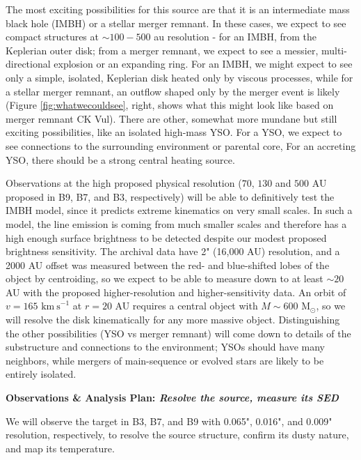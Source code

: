\documentclass[12pt,a4paper]{article}  %
\newcommand{\msun}{\ensuremath{\mathrm{M}_\odot}\xspace}
\newcommand{\kms}{\ensuremath{\mathrm{km~s}^{-1}}\xspace}
\begin{document}


The most exciting possibilities for this source are that it is an intermediate mass black hole (IMBH) or  a stellar merger remnant.
In these cases, we expect to see compact structures at $\sim100-500$ au resolution - for an IMBH, from the Keplerian outer disk; from a merger remnant, we expect to see a messier, multi-directional explosion or an expanding ring.
For an IMBH, we might expect to see only a simple, isolated, Keplerian disk heated only by viscous processes,
while for a stellar merger remnant, an outflow shaped only by the merger event is likely (Figure \ref{fig:whatwecouldsee}, right, shows what this might look like based on merger remnant CK Vul).
There are other, somewhat more mundane but still exciting possibilities, like an isolated high-mass YSO.
For a YSO, we expect to see connections to the surrounding environment or parental core, 
For an accreting YSO, there should be a strong central heating source.

Observations at the high proposed physical resolution ($70$, $130$ and $500$ AU proposed in B9, B7, and B3, respectively) will be able to definitively test the IMBH model, since it predicts extreme kinematics on very small scales.
In such a model, the line emission is coming from much smaller scales and therefore has a high enough surface brightness to be detected despite our modest proposed brightness sensitivity.
The archival data have 2" (16,000 AU) resolution, and a 2000 AU offset was measured between the red- and blue-shifted lobes of the object by centroiding, so we expect to be able to measure down to at least $\sim20$ AU with the proposed higher-resolution and higher-sensitivity data.
An orbit of $v=165$ \kms at $r=20$ AU requires a central object with $M\sim600$ \msun, so we will resolve the disk kinematically for any more massive object.
Distinguishing the other possibilities (YSO vs merger remnant) will come down to details of the substructure and connections to the environment; YSOs should have many neighbors, while mergers of main-sequence or evolved stars are likely to be entirely isolated.





\vspace{-0.5em}
\begin{center}
\large
\textbf{{Observations \& Analysis Plan: \emph{Resolve the source, measure its SED}}}
\end{center} 
\begin{tcolorbox}
\noindent 
We will observe the target in B3, B7, and B9 with 0.065", 0.016", and 0.009" resolution, respectively, to resolve the source structure, confirm its dusty nature, and map its temperature.
\end{tcolorbox}
\end{document}
